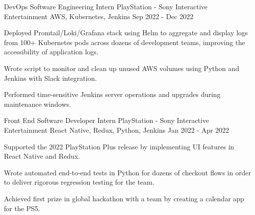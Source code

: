

\begin{cventries}

  \cventry
    {DevOps Software Engineering Intern} %
    {PlayStation - Sony Interactive Entertainment} %
    {AWS, Kubernetes, Jenkins} %
    {Sep 2022 - Dec 2022} %
    {
      \begin{cvitems} %
        \item {Deployed {Promtail/Loki/Grafana} stack using {Helm} to aggregate and display logs from 100+ {Kubernetes} pods across dozens of development teams, improving the accessibility of application logs.}
        \item {Wrote script to monitor and clean up unused AWS volumes using {Python} and {Jenkins} with Slack integration.}
        \item {Performed {time-sensitive} Jenkins server operations and upgrades during maintenance windows.}
      \end{cvitems}
    }

  \cventry
    {Front End Software Developer Intern} %
    {PlayStation - Sony Interactive Entertainment} %
    {React Native, Redux, Python, Jenkins} %
    {Jan 2022 - Apr 2022} %
    {
      \begin{cvitems} %
        \item {Supported the 2022 PlayStation Plus release by implementing UI features in {React Native} and {Redux}.}
        \item {Wrote automated end-to-end tests in {Python} for dozens of checkout flows in order to deliver rigorous {regression testing} for the team.} 
        \item {Achieved {first prize} in global hackathon with a team by creating a calendar app for the PS5.}
      \end{cvitems}
    }


\end{cventries}
